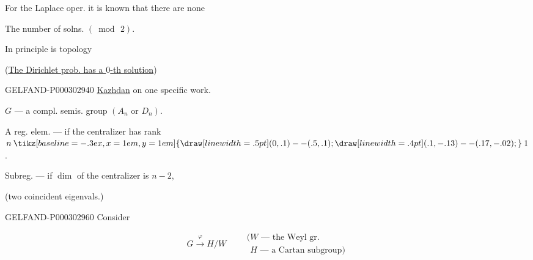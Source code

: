 For the Laplace oper. it is known that there are none

The number of solns. $(\bmod\,2)$.

In principle  is topology

(\underline{The Dirichlet prob. has a $0$-th solution})

\begin{center}\end{center}

\begin{GelfandAdjacentEvidence}{GELFAND-P000302}{940}
\underline{Kazhdan} on one specific work.

$G$ --- a compl. semis. group $(A_n\text{ or }D_n)$.

A reg. elem. --- if the centralizer has rank \underline{\underline{$n\mathbin{\tikz[baseline=-.3ex, x=1em, y=1em]{\draw[line width=.5pt](0,.1)--(.5,.1);\draw[line width=.4pt](.1,-.13)--(.17,-.02);}}1$}}.

Subreg. --- if $\dim$ of the centralizer is \underline{\underline{$n-2$}},

(two coincident eigenvals.)

\end{GelfandAdjacentEvidence}


\begin{GelfandAdjacentEvidence}{GELFAND-P000302}{960}
Consider

\begin{equation*}G\overset{\varphi}{\longrightarrow}H/W\qquad\begin{array}{l}(W\text{ --- the Weyl gr.}\\\phantom{(}H\text{ --- a Cartan subgroup})\end{array}\end{equation*}\end{GelfandAdjacentEvidence}

